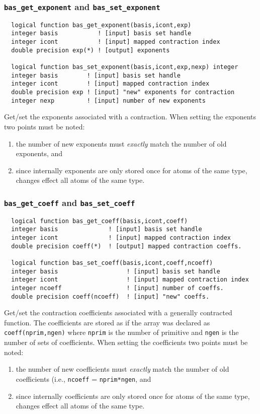 \subsubsection{{\tt bas\_get\_exponent} and {\tt bas\_set\_exponent}}
\begin{verbatim}
  logical function bas_get_exponent(basis,icont,exp)
  integer basis           ! [input] basis set handle
  integer icont           ! [input] mapped contraction index
  double precision exp(*) ! [output] exponents

  logical function bas_set_exponent(basis,icont,exp,nexp) integer
  integer basis        ! [input] basis set handle
  integer icont        ! [input] mapped contraction index
  double precision exp ! [input] "new" exponents for contraction
  integer nexp         ! [input] number of new exponents
\end{verbatim}
Get/set the exponents associated with a contraction.  When setting the
exponents two points must be noted:
\begin{enumerate}
\item the number of new exponents must {\em exactly} match the number
  of old exponents, and
\item since internally exponents are only stored once for atoms of the
  same type, changes effect all atoms of the same type.
\end{enumerate}

\subsubsection{{\tt bas\_get\_coeff} and {\tt bas\_set\_coeff}}
\begin{verbatim}
  logical function bas_get_coeff(basis,icont,coeff)
  integer basis              ! [input] basis set handle
  integer icont              ! [input] mapped contraction index
  double precision coeff(*)  ! [output] mapped contraction coeffs.

  logical function bas_set_coeff(basis,icont,coeff,ncoeff)
  integer basis                   ! [input] basis set handle                   
  integer icont                   ! [input] mapped contraction index           
  integer ncoeff                  ! [input] number of coeffs.
  double precision coeff(ncoeff)  ! [input] "new" coeffs. 
\end{verbatim}
Get/set the contraction coefficients associated with a generally
contracted function.  The coefficients are stored as if the array was
declared as {\tt coeff(nprim,ngen)} where {\tt nprim} is the number of
primitive and {\tt ngen} is the number of sets of coefficients.  When
setting the coefficients two points must be noted:
\begin{enumerate}
\item the number of new coefficients must {\em exactly} match the
  number of old coefficients (i.e., {\tt ncoeff} = {\tt nprim*ngen}, and
\item since internally coefficients are only stored once for atoms of the
  same type, changes effect all atoms of the same type.
\end{enumerate}

